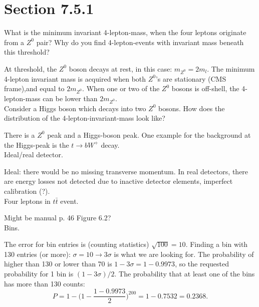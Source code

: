 \documentclass{article}
\begin{document}
\section{Section 7.5.1}
What is the minimum invariant 4-lepton-mass, when the four leptons originate from a $Z^0$ pair? Why do you find 4-lepton-events with invariant mass beneath this threshold?
\par At threshold, the $Z^0$ boson decays at rest, in this case: $m_{Z^0} = 2 m_l$. The minimum 4-lepton invariant mass is acquired when both $Z^0$'s are stationary (CMS frame),and equal to $2m_{Z^0}$. When one or two of the $Z^0$ bosons is off-shell, the 4-lepton-mass can be lower than $2 m_{Z^0}$. \\[14pt]
Consider a Higgs boson which decays into two $Z^0$ bosons. How does the distribution of the 4-lepton-invariant-mass look like?
\par There is a $Z^0$ peak and a Higgs-boson peak. One example for the background at the Higgs-peak is the $t \rightarrow bW^+$ decay.\\[14pt]
Ideal/real detector.
\par Ideal: there would be no missing transverse momentum. In real detectors, there are energy losses not detected due to inactive detector elements, imperfect calibration (?).\\[14pt]
Four leptons in $t \bar{t}$ event.
\par Might be manual p. 46 Figure 6.2?\\[14pt]
Bins.
\par The error for bin entries is (counting statistics) $\sqrt{100} = 10$. Finding a bin with 130 entries (or more): $\sigma = 10 \rightarrow 3\sigma$ is what we are looking for. The probability of higher than 130 or lower than 70 is $ 1- 3 \sigma = 1-0.9973$, so the requested probability for 1 bin is $(1-3\sigma)/2$. The probability that at least one of the bins has more than 130 counts:
\begin{equation}
P = 1 - \Big( 1 - \frac{1- 0.9973}{2} \Big)^{200} = 1-0.7532 = 0.2368.
\end{equation} 
\end{document}
